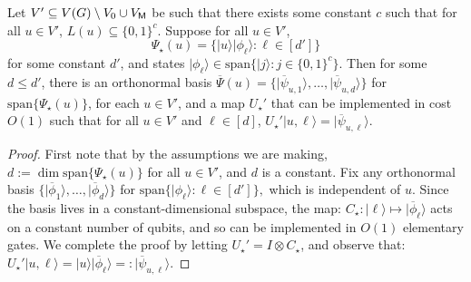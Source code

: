 \documentclass{article}
\def\ket#1{{\lvert}#1\rangle}
\renewcommand{\>}{\rangle}
\newcommand{\<}{\langle}
\renewcommand{\(}{\left(}
\renewcommand{\)}{\right)}
\begin{document}
\begin{lemma}\label{lem:const-stars}
Let $V'\subseteq V(G)\setminus V_0\cup V_{\sf M}$ be such that there exists some constant $c$ such that for all $u\in V'$, $L(u)\subseteq \{0,1\}^c$. Suppose for all $u\in V'$, 
$$\Psi_\star(u)=\{\ket{u}\ket{\phi_\ell}:\ell\in [d']\}$$
for some constant $d'$, and states $\ket{\phi_{\ell}}\in \mathrm{span}\{\ket{j}:j\in \{0,1\}^c\}$. 
Then for some $d\leq d'$, there is an orthonormal basis $\overline{\Psi}(u)=\{\ket{\overline{\psi}_{u,1}},\dots,\ket{\overline{\psi}_{u,d}}\}$ for $\mathrm{span}\{\Psi_\star(u)\}$, for each $u\in V'$, and a map $U_\star'$ that can be implemented in cost $O(1)$ such that for all $u\in V'$ and $\ell\in[d]$, $U_\star'\ket{u,\ell}=\ket{\overline{\psi}_{u,\ell}}$. 
\end{lemma}
\begin{proof}
First note that by the assumptions we are making, $d:=\dim \mathrm{span}\{\Psi_\star(u)\}$ for all $u\in V'$, and $d$ is a constant. Fix any orthonormal basis 
$\{\ket{\overline{\phi}_1},\dots,\ket{\overline{\phi}_d}\}$ for 
$\mathrm{span}\{\ket{\phi_{\ell}}:\ell\in [d']\},$
which is independent of $u$. Since the basis lives in a constant-dimensional subspace, the map:
$C_\star:\ket{\ell}\mapsto \ket{\overline{\phi}_\ell}$
acts on a constant number of qubits, and so can be implemented in $O(1)$ elementary gates. We complete the proof by letting $U_\star'=I\otimes C_{\star}$, and observe that: $U_\star'\ket{u,\ell} = \ket{u}\ket{\overline{\phi}_\ell}=:\ket{\overline{\psi}_{u,\ell}}$.
\end{proof}
\end{document}
